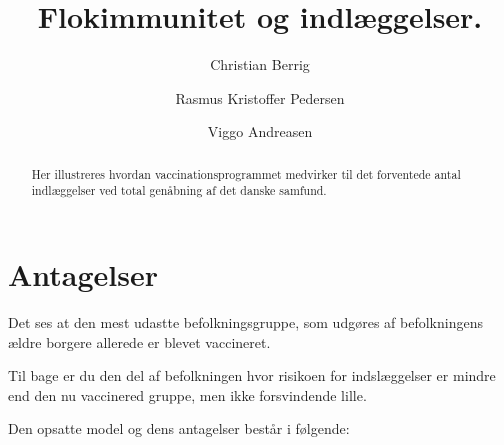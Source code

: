 \documentclass{article}
\author{Christian Berrig \and Rasmus Kristoffer Pedersen \and Viggo Andreasen}
\title{Flokimmunitet og indlæggelser.}
\begin{document}
\maketitle

\begin{abstract}
Her illustreres hvordan vaccinationsprogrammet medvirker til det forventede antal indlæggelser ved total genåbning af det danske samfund.
\end{abstract}

\section*{Antagelser}

Det ses at den mest udastte befolkningsgruppe, som udgøres af befolkningens ældre borgere allerede er blevet vaccineret.

Til bage er du den del af befolkningen hvor risikoen for indslæggelser er mindre end den nu vaccinered gruppe, men ikke forsvindende lille.

Den opsatte model og dens antagelser består i følgende:
\end{document}
